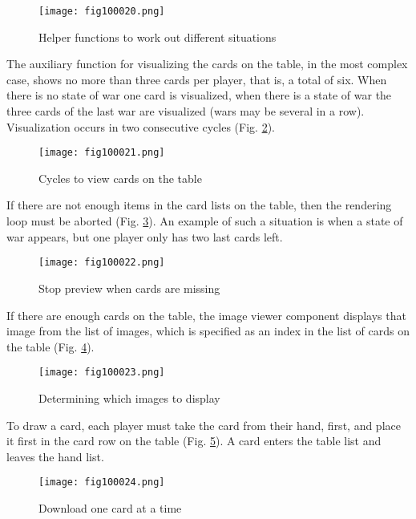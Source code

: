 \begin{figure}[H]
   \centering
   \texttt{[image: fig100020.png]}
   \caption{Helper functions to work out different situations}
\label{fig100020}
\end{figure}

The auxiliary function for visualizing the cards on the table, in the most complex case, shows no more than three cards per player, that is, a total of six. When there is no state of war one card is visualized, when there is a state of war the three cards of the last war are visualized (wars may be several in a row). Visualization occurs in two consecutive cycles (Fig. \ref{fig100021}).

\begin{figure}[H]
   \centering
   \texttt{[image: fig100021.png]}
   \caption{Cycles to view cards on the table}
\label{fig100021}
\end{figure}

If there are not enough items in the card lists on the table, then the rendering loop must be aborted (Fig. \ref{fig100022}). An example of such a situation is when a state of war appears, but one player only has two last cards left.

\begin{figure}[H]
   \centering
   \texttt{[image: fig100022.png]}
   \caption{Stop preview when cards are missing}
\label{fig100022}
\end{figure}

If there are enough cards on the table, the image viewer component displays that image from the list of images, which is specified as an index in the list of cards on the table (Fig. \ref{fig100023}).

\begin{figure}[H]
   \centering
   \texttt{[image: fig100023.png]}
   \caption{Determining which images to display}
\label{fig100023}
\end{figure}

To draw a card, each player must take the card from their hand, first, and place it first in the card row on the table (Fig. \ref{fig100024}). A card enters the table list and leaves the hand list.

\begin{figure}[H]
   \centering
   \texttt{[image: fig100024.png]}
   \caption{Download one card at a time}
\label{fig100024}
\end{figure}


